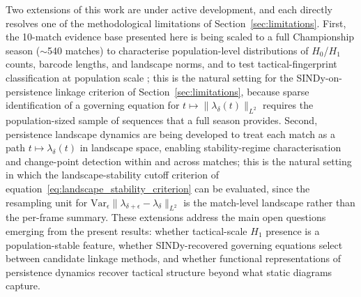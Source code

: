 Two extensions of this work are under active development, and each directly resolves one of the methodological limitations of Section~\ref{sec:limitations}. First, the 10-match evidence base presented here is being scaled to a full Championship season ($\sim$540 matches) to characterise population-level distributions of $H_0$/$H_1$ counts, barcode lengths, and landscape norms, and to test tactical-fingerprint classification at population scale \citep{Brown2026inprep}; this is the natural setting for the SINDy-on-persistence linkage criterion of Section~\ref{sec:limitations}, because sparse identification of a governing equation for $t\mapsto\|\lambda_\delta(t)\|_{L^2}$ requires the population-sized sample of sequences that a full season provides. Second, persistence landscape dynamics \citep{Bubenik2015,Chazal2014} are being developed to treat each match as a path $t \mapsto \lambda_\delta(t)$ in landscape space, enabling stability-regime characterisation and change-point detection within and across matches; this is the natural setting in which the landscape-stability cutoff criterion of equation~\eqref{eq:landscape_stability_criterion} can be evaluated, since the resampling unit for $\mathrm{Var}_\epsilon\|\lambda_{\delta+\epsilon}-\lambda_\delta\|_{L^2}$ is the match-level landscape rather than the per-frame summary. These extensions address the main open questions emerging from the present results: whether tactical-scale $H_1$ presence is a population-stable feature, whether SINDy-recovered governing equations select between candidate linkage methods, and whether functional representations of persistence dynamics recover tactical structure beyond what static diagrams capture.
